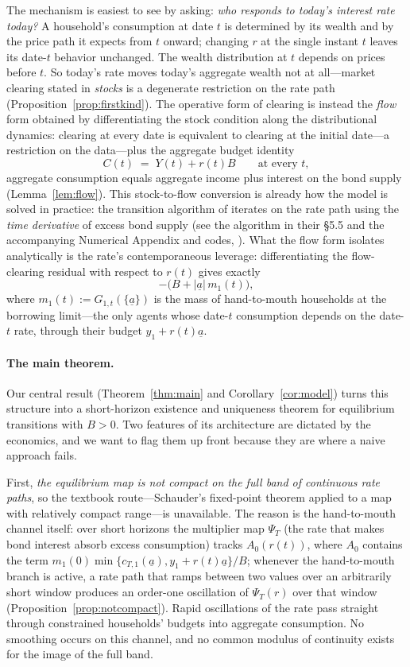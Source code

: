 \documentclass[11pt]{article}
\theoremstyle{definition}
\theoremstyle{remark}
\newcommand{\ubar}[1]{\underline{#1}}
\newcommand{\uba}{\ubar{a}}
\newcommand{\psit}{\Psi_T}
\begin{document}
The mechanism is easiest to see by asking: \emph{who responds to
today's interest rate today?} A household's consumption at date $t$ is
determined by its wealth and by the price path it expects from $t$
onward; changing $r$ at the single instant $t$ leaves its date-$t$
behavior unchanged. The wealth distribution at $t$ depends on prices
before $t$. So today's rate moves today's aggregate wealth not at
all---market clearing stated in \emph{stocks} is a degenerate
restriction on the rate path (Proposition~\ref{prop:firstkind}). The
operative form of clearing is instead the \emph{flow} form obtained by
differentiating the stock condition along the distributional
dynamics: clearing at every date is equivalent to clearing at the
initial date---a restriction on the data---plus the aggregate budget
identity
\[
C(t)\;=\;Y(t)+r(t)B \qquad\text{at every }t,
\]
aggregate consumption equals aggregate income plus interest on the
bond supply (Lemma~\ref{lem:flow}). This stock-to-flow conversion is
already how the model is solved in practice: the transition algorithm
of \citet{AHLLM2022} iterates on the rate path using the \emph{time
derivative} of excess bond supply (see the algorithm in their \S5.5
and the accompanying Numerical Appendix and codes,
\citealp{AHLLMnum}). What the flow form isolates analytically is the
rate's contemporaneous leverage: differentiating the flow-clearing
residual with respect to $r(t)$ gives exactly
\[
-\big(B+|\uba|\,m_1(t)\big),
\]
where $m_1(t):=G_{1,t}(\{\uba\})$ is the mass of hand-to-mouth
households at the borrowing limit---the only agents whose date-$t$
consumption depends on the date-$t$ rate, through their budget
$y_1+r(t)\uba$.

\paragraph{The main theorem.}
Our central result (Theorem~\ref{thm:main} and
Corollary~\ref{cor:model}) turns this structure into a short-horizon
existence and uniqueness theorem for equilibrium transitions with
$B>0$. Two features of its architecture are dictated by the economics,
and we want to flag them up front because they are where a naive
approach fails.

First, \emph{the equilibrium map is not compact on the full band of
continuous rate paths}, so the textbook route---Schauder's fixed-point
theorem applied to a map with relatively compact range---is
unavailable. The reason is the hand-to-mouth channel itself: over
short horizons the multiplier map $\psit$ (the rate that makes bond
interest absorb excess consumption) tracks
$A_0(r(t))$, where $A_0$ contains the term
$m_1(0)\min\{c_{T,1}(\uba),y_1+r(t)\uba\}/B$; whenever the
hand-to-mouth branch is active, a rate path that ramps between two
values over an arbitrarily short window produces an order-one
oscillation of $\psit(r)$ over that window
(Proposition~\ref{prop:notcompact}). Rapid oscillations of the rate
pass straight through constrained households' budgets into aggregate
consumption. No smoothing occurs on this channel, and no common
modulus of continuity exists for the image of the full band.
\end{document}
